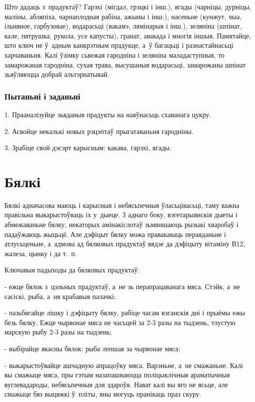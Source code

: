 Што дадаць з~прадуктаў? Гарэхі (мігдал, грэцкі і інш.), ягады (чарніцы, дурніцы, маліны, абляпіха, чарнаплодная рабіна, ажыны і інш.), насеньне (кунжут, чыа, ільняное, гарбузовае), водарасьці (вакамэ, лямінарыя і інш.), зеляніна (шпінат, кале, пятрушка, рукола, усе капусты), гранат, авакада і многія іншыя. Памятайце, што ключ не ў~адным канкрэтным прадукце, а~ў багацьці і разнастайнасьці харчаваньня. Калі ўзімку сьвежая гародніна і зеляніна маладаступныя, то замарожаная гародніна, сухая трава, высушаныя водарасьці, замарожаны шпінат зьяўляюцца добрай альтэрнатывай.

\subsubsection{Пытаньні і заданьні}

1. Прааналізуйце зьяданыя прадукты на наяўнасьць схаванага цукру.

2. Асвойце некалькі новых рэцэптаў прыгатаваньня гародніны.

3. Зрабіце свой дэсэрт карысным: какава, гарэхі, ягады.


\section{Бялкі}

Бялкі адначасова маюць і карысныя і небясьпечныя ўласьцівасьці, таму важна правільна выкарыстоўваць іх у~дыеце. З аднаго боку, вэгетарыянскія дыеты і абмежаваньне бялку, некаторых амінакіслотаў зьмяншаюць рызыкі хваробаў і падаўжаюць жыцьцё. Але дэфіцыт бялку можа правакаваць пераяданьне і атлусьценьне, а~адмова ад бялковых прадуктаў вядзе да дэфіцыту вітаміну В12, жалеза, цынку і да т.~п.

Ключавыя падыходы да бялковых прадуктаў:

- ежце бялок з~цэльных прадуктаў, а~не зь перапрацаванага мяса. Стэйк, а~не сасіскі, рыба, а~ня крабавыя палачкі;

- пазьбягайце лішку і дэфіцыту бялку, рабіце часам вэганскія дні і прыёмы ежы безь бялку. Ежце чырвонае мяса не часьцей за 2-3 разы на тыдзень, тлустую марскую рыбу 2-3 разы на тыдзень;

- выбірайце якасны бялок: рыба лепшая за чырвонае мяса;

- выкарыстоўвайце ашчадную апрацоўку мяса. Варэньне, а~не смажаньне. Калі вы смажыце мяса, пры гэтым назапашваюцца поліцыклічныя араматычныя вуглевадароды, небясьпечныя для здароўя. Нават калі вы яго не ясьце, але смажыце бяз выцяжкі ў~пліты, яны могуць пранікаць праз скуру.

